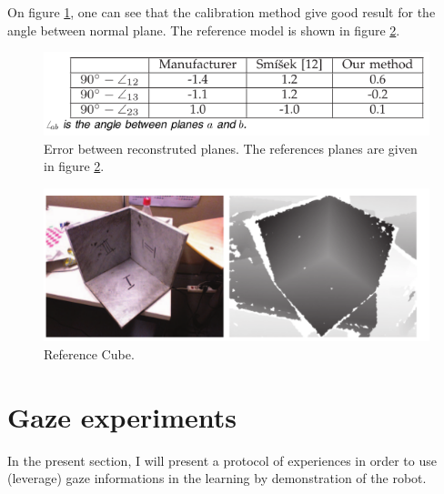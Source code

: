 \documentclass[11pt,a4paper]{article}
\begin{document}
On figure \ref{CubeError_Herrera}, one can see that the calibration method give good result for the angle between normal plane. The reference model is shown in figure \ref{Cube_Herrera}.

\begin{figure}[!h]
\centering
\includegraphics[scale=0.55]{Pictures/CubeError_Herrera}
\caption{Error between reconstruted planes. The references planes are given in figure \ref{Cube_Herrera}. \label{CubeError_Herrera}}
\end{figure}

\begin{figure}[!h]
\centering
\includegraphics[scale=0.55]{Pictures/Cube_Herrera}
\caption{Reference Cube. \label{Cube_Herrera}}
\end{figure}

\clearpage

\section{Gaze experiments}
In the present section, I will present a protocol of experiences in order to use (leverage) gaze informations in the learning by demonstration of the robot. 
\end{document}
